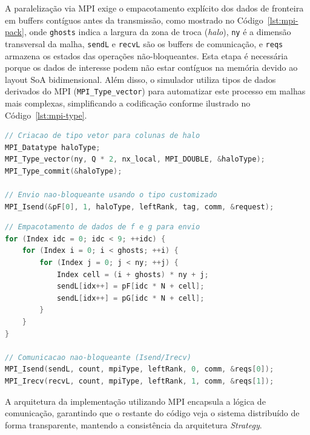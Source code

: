 A paralelização via MPI exige o empacotamento explícito dos dados de fronteira em buffers contíguos antes da transmissão, como mostrado no Código~\ref{lst:mpi-pack}, onde \texttt{ghosts} indica a largura da zona de troca (\textit{halo}), \texttt{ny} é a dimensão transversal da malha, \texttt{sendL} e \texttt{recvL} são os buffers de comunicação, e \texttt{reqs} armazena os estados das operações não-bloqueantes.
Esta etapa é necessária porque os dados de interesse podem não estar contíguos na memória devido ao layout SoA bidimensional.
Além disso, o simulador utiliza tipos de dados derivados do MPI (\texttt{MPI\_Type\_vector}) para automatizar este processo em malhas mais complexas, simplificando a codificação conforme ilustrado no Código~\ref{lst:mpi-type}.
\begin{lstlisting}[language=C++, caption={Uso de tipos derivados MPI para troca de halos.}, label={lst:mpi-type}, float=ht]
// Criacao de tipo vetor para colunas de halo
MPI_Datatype haloType;
MPI_Type_vector(ny, Q * 2, nx_local, MPI_DOUBLE, &haloType);
MPI_Type_commit(&haloType);

// Envio nao-bloqueante usando o tipo customizado
MPI_Isend(&pF[0], 1, haloType, leftRank, tag, comm, &request);
\end{lstlisting}
\begin{lstlisting}[language=C++, caption={Empacotamento de halos e comunicação não-bloqueante MPI.}, label={lst:mpi-pack}, float=ht]
// Empacotamento de dados de f e g para envio
for (Index idc = 0; idc < 9; ++idc) {
    for (Index i = 0; i < ghosts; ++i) {
        for (Index j = 0; j < ny; ++j) {
            Index cell = (i + ghosts) * ny + j;
            sendL[idx++] = pF[idc * N + cell];
            sendL[idx++] = pG[idc * N + cell];
        }
    }
}

// Comunicacao nao-bloqueante (Isend/Irecv)
MPI_Isend(sendL, count, mpiType, leftRank, 0, comm, &reqs[0]);
MPI_Irecv(recvL, count, mpiType, leftRank, 1, comm, &reqs[1]);
\end{lstlisting}

A arquitetura da implementação utilizando MPI encapsula a lógica de comunicação, garantindo que o restante do código veja o sistema distribuído de forma transparente, mantendo a consistência da arquitetura \textit{Strategy}.
